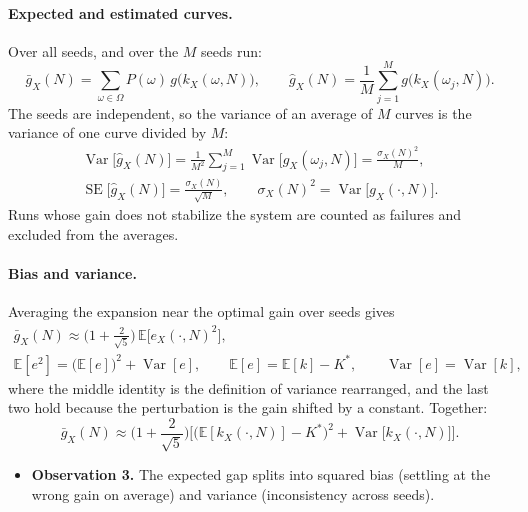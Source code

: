 \documentclass[11pt]{article}
\begin{document}
\paragraph{Expected and estimated curves.} Over all seeds, and over the $M$ seeds run:
\[
  \bar g_X(N) = \sum_{\omega \in \Omega} P(\omega)\, g\big(k_X(\omega, N)\big), \qquad
  \hat g_X(N) = \frac{1}{M} \sum_{j=1}^{M} g\big(k_X(\omega_j, N)\big).
\]
The seeds are independent, so the variance of an average of $M$ curves is the variance of one curve
divided by $M$:
\begin{gather*}
  \operatorname{Var}\big[\hat g_X(N)\big] = \frac{1}{M^2} \sum_{j=1}^{M}
    \operatorname{Var}\big[g_X(\omega_j, N)\big] = \frac{\sigma_X(N)^2}{M}, \\
  \operatorname{SE}\big[\hat g_X(N)\big] = \frac{\sigma_X(N)}{\sqrt{M}}, \qquad
  \sigma_X(N)^2 = \operatorname{Var}\big[g_X(\cdot, N)\big].
\end{gather*}
Runs whose gain does not stabilize the system are counted as failures and excluded from the
averages.

\paragraph{Bias and variance.} Averaging the expansion near the optimal gain over seeds gives
\begin{gather*}
  \bar g_X(N) \approx \Big(1 + \frac{2}{\sqrt{5}}\Big)\, \mathbb{E}\big[e_X(\cdot, N)^2\big], \\
  \mathbb{E}[e^2] = \big(\mathbb{E}[e]\big)^2 + \operatorname{Var}[e], \qquad
  \mathbb{E}[e] = \mathbb{E}[k] - K^*, \qquad \operatorname{Var}[e] = \operatorname{Var}[k],
\end{gather*}
where the middle identity is the definition of variance rearranged, and the last two hold because
the perturbation is the gain shifted by a constant. Together:
\[
  \bar g_X(N) \approx \Big(1 + \frac{2}{\sqrt{5}}\Big)\Big[\big(\mathbb{E}[k_X(\cdot, N)] - K^*\big)^2
  + \operatorname{Var}\big[k_X(\cdot, N)\big]\Big].
\]
\begin{itemize}
  \item \textbf{Observation 3.} The expected gap splits into squared bias (settling at the wrong gain
    on average) and variance (inconsistency across seeds).
\end{itemize}
\end{document}
